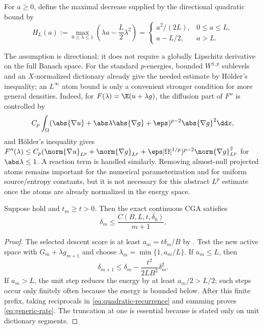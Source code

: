 For $a\geq0$, define the maximal decrease supplied by the directional quadratic
bound by
\[
 H_L(a):=\max_{0\leq\lambda\leq1}
       \left(\lambda a-\frac L2\lambda^2\right)
 =\begin{cases}a^2/(2L),&0\leq a\leq L,\\
                 a-L/2,&a>L.
   \end{cases}
\]

The assumption is directional; it does not require a globally Lipschitz derivative on the full Banach
space. For the standard \(p\)-energies, bounded \(W^{1,p}\) sublevels and an \(X\)-normalized dictionary
already give the needed estimate by H\"older's inequality; an \(L^\infty\) atom bound is only a
convenient stronger condition for more general densities. Indeed, for
\(F(\lambda)=\E(u+\lambda g)\), the diffusion part of \(F''\) is controlled by
\[
 C_p\int_\Omega(\abs{\nabla u}+\abs\lambda\abs{\nabla g}+\eps)^{p-2}
 \abs{\nabla g}^2\dd x,
\]
and H\"older's inequality gives
\(F''(\lambda)\leq C_p(\norm{\nabla u}_{L^p}+\norm{\nabla g}_{L^p}+\eps|\Omega|^{1/p})^{p-2}
\norm{\nabla g}_{L^p}^2\) for \(\abs\lambda\leq1\). A reaction term is handled similarly. Removing
almost-null projected atoms remains important for the numerical parameterization and for uniform
source/entropy constants, but it is not necessary for this abstract \(L^p\) estimate once the atoms are
already normalized in the energy space.

\begin{theorem}
\label{thm:generic}
Suppose  hold and \(t_m\geq t>0\). Then the exact continuous CGA
satisfies
\begin{equation}
  \delta_m\leq \frac{C(B,L,t,\delta_0)}{m+1}.
\label{eq:generic-rate}
\end{equation}
\end{theorem}

\begin{proof}
The selected descent score is at least \(a_m=t\delta_m/B\) by . Test the new
active space with \(G_m+\lambda g_{m+1}\) and choose
\(\lambda_m=\min\{1,a_m/L\}\). If \(a_m\leq L\), then
\begin{equation}
 \delta_{m+1}\leq\delta_m-\frac{t^2}{2LB^2}\delta_m^2.
\label{eq:quadratic-recurrence}
\end{equation}
If \(a_m>L\), the unit step reduces the energy by at least \(a_m/2>L/2\); such steps occur only
finitely often because the energy is bounded below. After this finite prefix, taking reciprocals in
\cref{eq:quadratic-recurrence} and summing proves \cref{eq:generic-rate}. The truncation at one is
essential because  is stated only on unit dictionary segments.
\end{proof}

